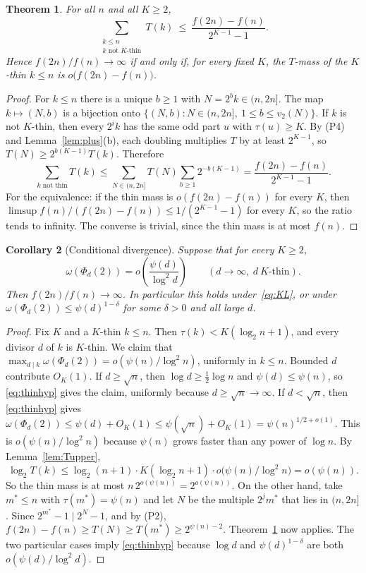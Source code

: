\documentclass[11pt]{amsart}
\newtheorem{theorem}{Theorem}[section]
\newtheorem{corollary}[theorem]{Corollary}
\theoremstyle{definition}
\theoremstyle{remark}
\begin{document}
\begin{theorem}\label{thm:thin}
For all $n$ and all $K\ge2$,
\[
\sum_{\substack{k\le n\\ k\text{ not }K\text{-thin}}}T(k)\ \le\ \frac{f(2n)-f(n)}{2^{K-1}-1}.
\]
Hence $f(2n)/f(n)\to\infty$ if and only if, for every fixed $K$, the $T$-mass of the $K$-thin $k\le n$ is
$o\bigl(f(2n)-f(n)\bigr)$.
\end{theorem}
\begin{proof}
For $k\le n$ there is a unique $b\ge1$ with $N=2^bk\in(n,2n]$. The map $k\mapsto(N,b)$ is a bijection onto
$\{(N,b):N\in(n,2n],\ 1\le b\le v_2(N)\}$. If $k$ is not $K$-thin, then every $2^ik$ has the same odd part $u$ with
$\tau(u)\ge K$. By (P4) and Lemma~\ref{lem:plus}(b), each doubling multiplies $T$ by at least $2^{K-1}$, so
$T(N)\ge2^{b(K-1)}T(k)$. Therefore
\[
\sum_{k\text{ not thin}}T(k)\le\sum_{N\in(n,2n]}T(N)\sum_{b\ge1}2^{-b(K-1)}=\frac{f(2n)-f(n)}{2^{K-1}-1}.
\]
For the equivalence: if the thin mass is $o(f(2n)-f(n))$ for every $K$, then
$\limsup f(n)/(f(2n)-f(n))\le1/(2^{K-1}-1)$ for every $K$, so the ratio tends to infinity. The converse is trivial,
since the thin mass is at most $f(n)$.
\end{proof}

\begin{corollary}[Conditional divergence]\label{cor:cond}
Suppose that for every $K\ge2$,
\begin{equation}\label{eq:thinhyp}
\omega(\Phi_d(2))=o\!\left(\frac{\psi(d)}{\log^2d}\right)\qquad(d\to\infty,\ d\ K\text{-thin}).
\end{equation}
Then $f(2n)/f(n)\to\infty$. In particular this holds under~\eqref{eq:KL}, or under
$\omega(\Phi_d(2))\le\psi(d)^{1-\delta}$ for some $\delta>0$ and all large $d$.
\end{corollary}
\begin{proof}
Fix $K$ and a $K$-thin $k\le n$. Then $\tau(k)<K(\log_2n+1)$, and every divisor $d$ of $k$ is $K$-thin. We claim that
$\max_{d\mid k}\omega(\Phi_d(2))=o(\psi(n)/\log^2n)$, uniformly in $k\le n$.
Bounded $d$ contribute $O_K(1)$. If $d\ge\sqrt n$, then $\log d\ge\frac12\log n$ and $\psi(d)\le\psi(n)$, so
\eqref{eq:thinhyp} gives the claim, uniformly because $d\ge\sqrt n\to\infty$. If $d<\sqrt n$, then
\eqref{eq:thinhyp} gives $\omega(\Phi_d(2))\le\psi(d)+O_K(1)\le\psi(\sqrt n)+O_K(1)=\psi(n)^{1/2+o(1)}$. This is
$o(\psi(n)/\log^2n)$ because $\psi(n)$ grows faster than any power of $\log n$.
By Lemma~\ref{lem:Tupper},
\[
\log_2T(k)\le\log_2(n+1)\cdot K(\log_2n+1)\cdot o\bigl(\psi(n)/\log^2n\bigr)=o(\psi(n)).
\]
So the thin mass is at most $n\,2^{o(\psi(n))}=2^{o(\psi(n))}$. On the other hand, take $m^*\le n$ with
$\tau(m^*)=\psi(n)$ and let $N$ be the multiple $2^jm^*$ that lies in $(n,2n]$. Since $2^{m^*}-1\mid2^N-1$, and by
(P2), $f(2n)-f(n)\ge T(N)\ge T(m^*)\ge2^{\psi(n)-2}$. Theorem~\ref{thm:thin} now applies. The two particular cases imply
\eqref{eq:thinhyp} because $\log d$ and $\psi(d)^{1-\delta}$ are both $o(\psi(d)/\log^2d)$.
\end{proof}
\end{document}
